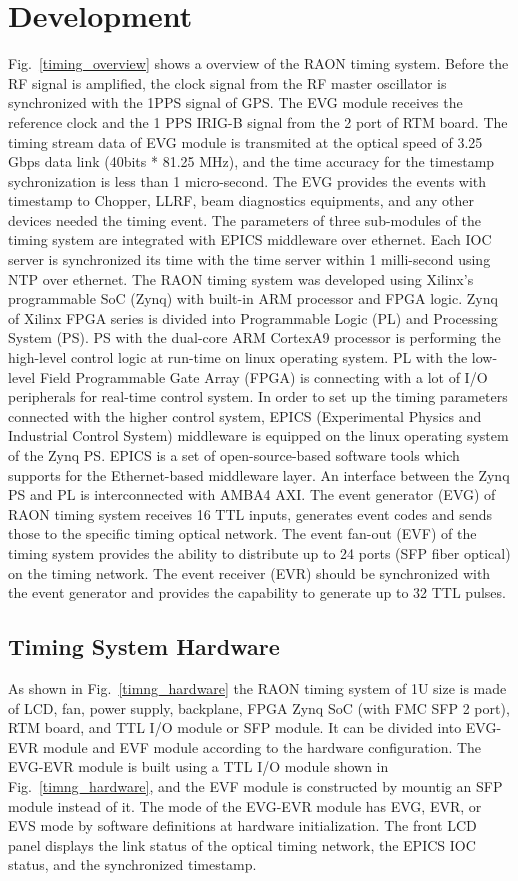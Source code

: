 \documentclass[journal,reqno]{IEEEtran}
\begin{document}
\section{Development}
Fig.~\ref{timing_overview} shows a overview of the RAON timing system. Before the RF signal is amplified, the clock signal from the RF master oscillator is synchronized with the 1PPS signal of GPS. The EVG module receives the reference clock and the 1 PPS IRIG-B signal from the 2 port of RTM board. The timing stream data of EVG module is transmited at the optical speed of 3.25 Gbps data link (40bits * 81.25 MHz), and the time accuracy for the timestamp sychronization is less than 1 micro-second. The EVG provides the events with timestamp to Chopper, LLRF, beam diagnostics equipments, and any other devices needed the timing event. The parameters of three sub-modules of the timing system are integrated with EPICS middleware over ethernet. Each IOC server is synchronized its time with the time server within 1 milli-second using NTP over ethernet. The RAON timing system was developed using Xilinx’s programmable SoC (Zynq) with built-in ARM processor and FPGA logic. Zynq of Xilinx FPGA series is divided into Programmable Logic (PL) and Processing System (PS). PS with the dual-core ARM CortexA9 processor is performing the high-level control logic at run-time on linux operating system. PL with the low-level Field Programmable Gate Array (FPGA) is connecting with a lot of I/O peripherals for real-time control system. In order to set up the timing parameters connected with the higher control system, EPICS (Experimental Physics and Industrial Control System) middleware is equipped on the linux operating system of the Zynq PS. EPICS is a set of open-source-based software tools which supports for the Ethernet-based middleware layer. An interface between the Zynq PS and PL is interconnected with AMBA4 AXI. The event generator (EVG) of RAON timing system receives 16 TTL inputs, generates event codes and sends those to the specific timing optical network. The event fan-out (EVF) of the timing system provides the ability to distribute up to 24 ports (SFP fiber optical) on the timing network. The event receiver (EVR) should be synchronized with the event generator and provides the capability to generate up to 32 TTL pulses. 
\subsection{Timing System Hardware}
As shown in Fig.~\ref{timng_hardware} the RAON timing system of 1U size is made of LCD, fan, power supply, backplane, FPGA Zynq SoC (with FMC SFP 2 port), RTM board, and TTL I/O module or SFP module. It can be divided into EVG-EVR module and EVF module according to the hardware configuration. The EVG-EVR module is built using a TTL I/O module shown in Fig.~\ref{timng_hardware}, and the EVF module is constructed by mountig an SFP module instead of it. The mode of the EVG-EVR module has EVG, EVR, or EVS mode by software definitions at hardware initialization. The front LCD panel displays the link status of the optical timing network, the EPICS IOC status, and the synchronized timestamp.
\end{document}
